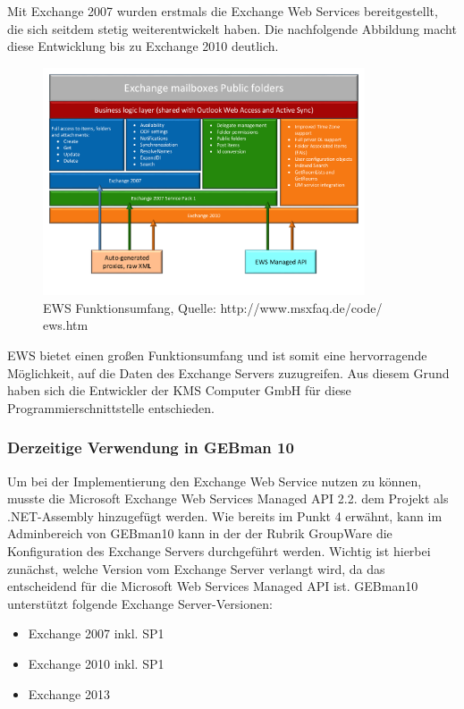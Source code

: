 \noindent
Mit Exchange 2007 wurden erstmals die Exchange Web Services bereitgestellt, die sich seitdem stetig weiterentwickelt haben. Die nachfolgende Abbildung macht diese Entwicklung bis zu Exchange 2010 deutlich.

\begin{figure}[h!]
\centering
\includegraphics[width=0.85\textwidth]{Abbildungen/EWS_Funktionsumfang.pdf}
	\caption[EWS Funktionsumfang]{EWS Funktionsumfang, Quelle: http://www.msxfaq.de/code/
	ews.htm}
	\label{fig:EWS_Funktionsumfang}
\end{figure}

\noindent
EWS bietet einen großen Funktionsumfang und ist somit eine hervorragende Möglichkeit, auf die Daten des Exchange Servers zuzugreifen. Aus diesem Grund haben sich die Entwickler der KMS Computer GmbH für diese Programmierschnittstelle entschieden.

\subsubsection{Derzeitige Verwendung in GEBman 10}
\noindent
Um bei der Implementierung den Exchange Web Service nutzen zu können, musste die Microsoft Exchange Web Services Managed API 2.2. dem Projekt als .NET-Assembly hinzugefügt werden. Wie bereits im Punkt 4 erwähnt, kann im Adminbereich von GEBman10 kann in der der Rubrik GroupWare die Konfiguration des Exchange Servers durchgeführt werden. Wichtig ist hierbei zunächst, welche Version vom Exchange Server verlangt wird, da das entscheidend für die Microsoft Web Services Managed API ist. GEBman10 unterstützt folgende Exchange Server-Versionen:

\begin{itemize}[topsep=-0.5\parskip]
\item Exchange 2007 inkl. SP1
\item  Exchange 2010 inkl. SP1
\item  Exchange 2013 
\end{itemize}

